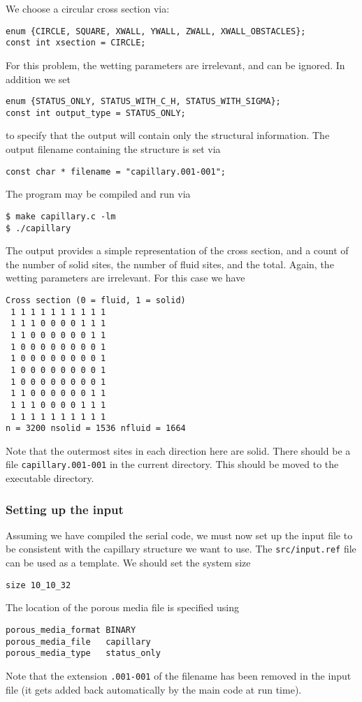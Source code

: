 We choose a circular cross section via:
\begin{lstlisting}
enum {CIRCLE, SQUARE, XWALL, YWALL, ZWALL, XWALL_OBSTACLES};
const int xsection = CIRCLE;
\end{lstlisting}
For this problem, the wetting parameters are irrelevant, and can be
ignored. In addition we set
\begin{lstlisting}
enum {STATUS_ONLY, STATUS_WITH_C_H, STATUS_WITH_SIGMA};
const int output_type = STATUS_ONLY;
\end{lstlisting}
to specify that the output will contain only the structural information.
The output filename containing the structure is set via
\begin{lstlisting}
const char * filename = "capillary.001-001";
\end{lstlisting}

The program may be compiled and run via
\begin{lstlisting}
$ make capillary.c -lm
$ ./capillary
\end{lstlisting}
The output provides a simple representation of the cross section,
and a count of the number of solid sites, the number of fluid sites,
and the total. Again, the wetting parameters are irrelevant. For this
case we have
\begin{lstlisting}
Cross section (0 = fluid, 1 = solid)
 1 1 1 1 1 1 1 1 1 1
 1 1 1 0 0 0 0 1 1 1
 1 1 0 0 0 0 0 0 1 1
 1 0 0 0 0 0 0 0 0 1
 1 0 0 0 0 0 0 0 0 1
 1 0 0 0 0 0 0 0 0 1
 1 0 0 0 0 0 0 0 0 1
 1 1 0 0 0 0 0 0 1 1
 1 1 1 0 0 0 0 1 1 1
 1 1 1 1 1 1 1 1 1 1
n = 3200 nsolid = 1536 nfluid = 1664
\end{lstlisting}
Note that the outermost sites in each direction here are solid. There
should be a file \texttt{capillary.001-001} in the current directory.
This should be moved to the executable directory.


\subsubsection{Setting up the input}

Assuming we have compiled the serial code, we must now set up the
input file to be consistent with the capillary structure we want
to use. The \texttt{src/input.ref} file can be used as a template.
We should set the system size
\begin{lstlisting}
size 10_10_32
\end{lstlisting}
The location of the porous media file is specified using
\begin{lstlisting}
porous_media_format BINARY
porous_media_file   capillary
porous_media_type   status_only
\end{lstlisting}
Note that the extension \texttt{.001-001} of the filename has been
removed in the input file (it gets added back automatically by the
main code at run time).

